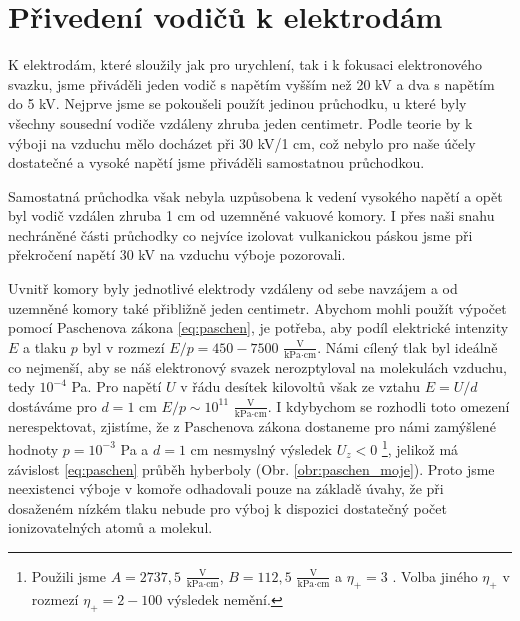 \section{Přivedení vodičů k elektrodám}
\par K elektrodám, které sloužily jak pro urychlení, tak i k fokusaci elektronového svazku, jsme přiváděli jeden vodič s napětím vyšším než 20 kV a dva s napětím do 5 kV. Nejprve jsme se pokoušeli použít jedinou průchodku, u které byly všechny sousední vodiče vzdáleny zhruba jeden centimetr. Podle teorie by k výboji na vzduchu mělo docházet při 30 kV/1 cm, což nebylo pro naše účely dostatečné a vysoké napětí jsme přiváděli samostatnou průchodkou.
\par Samostatná průchodka však nebyla uzpůsobena k vedení vysokého napětí a opět byl vodič vzdálen zhruba 1 cm od uzemněné vakuové komory. I přes naši snahu nechráněné části průchodky co nejvíce izolovat vulkanickou páskou jsme při překročení napětí 30 kV na vzduchu výboje pozorovali. 
\par Uvnitř komory byly jednotlivé elektrody vzdáleny od sebe navzájem a od uzemněné komory také přibližně jeden centimetr. Abychom mohli použít výpočet pomocí Paschenova zákona \eqref{eq:paschen}, je potřeba, aby podíl elektrické intenzity $E$ a tlaku $p$ byl v rozmezí $E/p=450-7500$ $\frac{\text{V}}{\text{kPa} \cdot \text{cm}}$. Námi cílený tlak byl ideálně co nejmenší, aby se náš elektronový svazek nerozptyloval na molekulách vzduchu, tedy $10^{-4}$ Pa. Pro napětí $U$ v řádu desítek kilovoltů však ze vztahu $E=U/d$ dostáváme pro $d=1$ cm $E/p \sim 10^{11}$ $\frac{\text{V}}{\text{kPa} \cdot \text{cm}}$. I kdybychom se rozhodli toto omezení nerespektovat, zjistíme, že z Paschenova zákona dostaneme pro námi zamýšlené hodnoty $p=10^{-3}$ Pa a $d=1$ cm nesmyslný výsledek $U_z<0$ \footnote{Použili jsme $A=2737,5$ $\frac{\text{V}}{\text{kPa} \cdot \text{cm}}$, $B=112,5$ $\frac{\text{V}}{\text{kPa} \cdot \text{cm}}$ a $\eta_+=3$ \cite{Bozhko}. Volba jiného $\eta_+$ v rozmezí $\eta_+=2-100$ výsledek nemění.}, jelikož má závislost \eqref{eq:paschen} průběh hyberboly (Obr. \ref{obr:paschen_moje}).
Proto jsme neexistenci výboje v komoře odhadovali pouze na základě úvahy, že při dosaženém nízkém tlaku nebude pro výboj k dispozici dostatečný počet ionizovatelných atomů a molekul.



